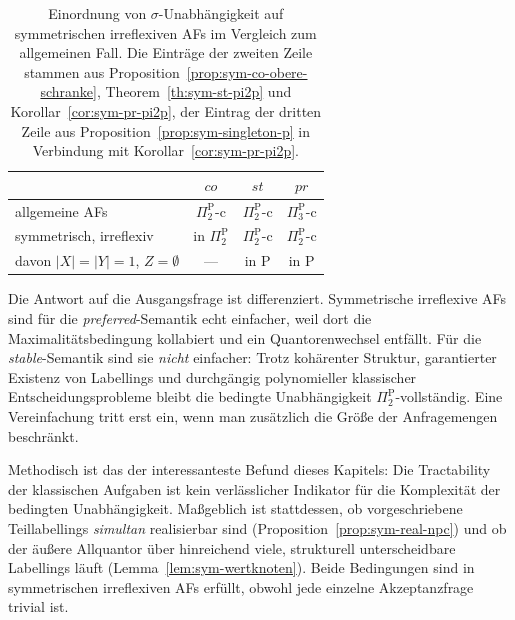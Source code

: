 \begin{table}[htbp]
    \myfloatalign
    \centering
    \renewcommand{\arraystretch}{1.15}
    \setlength{\tabcolsep}{1.0em}
    \begin{tabular}{lccc}
        \toprule
        & \(co\) & \(st\) & \(pr\) \\
        \midrule
        allgemeine AFs
            & \(\Pi_2^\text{P}\)-c
            & \(\Pi_2^\text{P}\)-c
            & \(\Pi_3^\text{P}\)-c \\
        symmetrisch, irreflexiv
            & in \(\Pi_2^\text{P}\)
            & \(\Pi_2^\text{P}\)-c
            & \(\Pi_2^\text{P}\)-c \\
        \quad davon \(|X|=|Y|=1\), \(Z=\emptyset\)
            & ---
            & in P
            & in P \\
        \bottomrule
    \end{tabular}
    \caption[Komplexität der Unabhängigkeit auf symmetrischen irreflexiven
    AFs]{Einordnung von \(\sigma\)-Unabhängigkeit auf symmetrischen
    irreflexiven AFs im Vergleich zum allgemeinen Fall. Die Einträge der
    zweiten Zeile stammen aus Proposition~\ref{prop:sym-co-obere-schranke},
    Theorem~\ref{th:sym-st-pi2p} und Korollar~\ref{cor:sym-pr-pi2p}, der
    Eintrag der dritten Zeile aus Proposition~\ref{prop:sym-singleton-p} in
    Verbindung mit Korollar~\ref{cor:sym-pr-pi2p}.}
    \label{tab:sym-komplexitaet}
\end{table}

Die Antwort auf die Ausgangsfrage ist differenziert. Symmetrische irreflexive
AFs sind für die \textit{preferred}-Semantik echt einfacher, weil dort die
Maximalitätsbedingung kollabiert und ein Quantorenwechsel entfällt. Für die
\textit{stable}-Semantik sind sie \emph{nicht} einfacher: Trotz kohärenter
Struktur, garantierter Existenz von Labellings und durchgängig polynomieller
klassischer Entscheidungsprobleme bleibt die bedingte Unabhängigkeit
\(\Pi_2^\text{P}\)-vollständig. Eine Vereinfachung tritt erst ein, wenn man
zusätzlich die Größe der Anfragemengen beschränkt.

Methodisch ist das der interessanteste Befund dieses Kapitels: Die
Tractability der klassischen Aufgaben ist kein verlässlicher Indikator für die
Komplexität der bedingten Unabhängigkeit. Maßgeblich ist stattdessen, ob
vorgeschriebene Teillabellings \emph{simultan} realisierbar sind
(Proposition~\ref{prop:sym-real-npc}) und ob der äußere Allquantor über
hinreichend viele, strukturell unterscheidbare Labellings läuft
(Lemma~\ref{lem:sym-wertknoten}). Beide Bedingungen sind in symmetrischen
irreflexiven AFs erfüllt, obwohl jede einzelne Akzeptanzfrage trivial ist.

